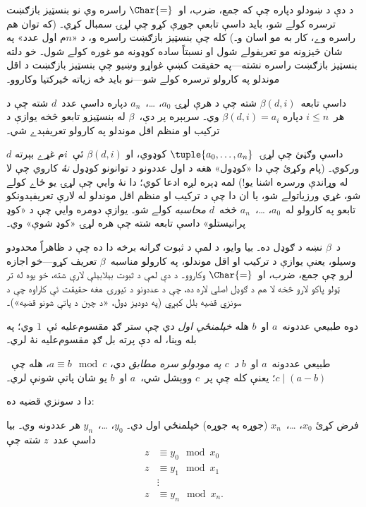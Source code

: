 \documentclass[../../../include/open-logic-section]{subfiles}
\begin{document}


د دې د ښودلو دپاره چې که جمع، ضرب، او~$\Char{=}$ راسره وي نو
بنسټيز بازګښت ترسره کولے شو، بايد داسې تابعې جوړې کړو چې لړۍ سمبال
کړي۔ (که توان هم راسره وے، کار به مو اسان و۔) کله چې بنسټيز بازګښت
راسره و، د «$n$م اول عدد» په شان څيزونه مو تعريفولے شول او نسبتاً
ساده کوډونه مو غوره کولے شول۔ خو دلته بنسټيز بازګښت راسره نشته---په
حقيقت کښې غواړو وښيو چې بنسټيز بازګښت د اقل موندلو په کارولو ترسره
کولے شو---نو بايد څه زياته ځيرکتيا وکاروو۔

\begin{lem}
داسې تابعه~$\beta(d,i)$ شته چې د هرې لړۍ $a_0$، \dots،~$a_n$
دپاره داسې عدد~$d$ شته چې د هر~$i \le n$ دپاره
$\beta(d,i) = a_i$ وي۔ سربېره پر دې،~$\beta$ له بنسټيزو تابعو څخه
يوازې د ترکيب او منظم اقل موندلو په کارولو تعريفېدے شي۔
\end{lem}

$d$ داسې وګڼئ چې لړۍ~$\tuple{a_0, \dots, a_n}$ کوډوي، او
$\beta(d,i)$ ئې~$i$م غړے بېرته ورکوي۔ (پام وکړئ چې دا «کوډول» هغه
د اول عددونو د توانونو کوډول \emph{نۀ} کاروي چې لا له وړاندې ورسره
اشنا يو!) لمه ډېره لږه ادعا کوي؛ دا نۀ وايي چې لړۍ يو ځاے کولے شو،
غړي ورزياتولے شو، يا ان دا چې د ترکيب او منظم اقل موندلو له لارې
تعريفېدونکو تابعو په کارولو له~$a_0$، \dots،~$a_n$ څخه~$d$
\emph{محاسبه} کولے شو۔ يوازې دومره وايي چې د «کوډ پرانيستلو» داسې
تابعه شته چې هره لړۍ «کوډ شوې» وي۔

د~$\beta$ نښه د ګوډل ده۔ بيا وايو، د لمې د ثبوت ګرانه برخه دا ده
چې د ظاهراً محدودو وسيلو، يعنې يوازې د ترکيب او اقل موندلو، په
کارولو مناسبه~$\beta$ تعريف کړو---خو اجازه لرو چې جمع، ضرب،
او~$\Char{=}$ وکاروو۔ د دې لمې د ثبوت بېلابېلې لارې شته، خو يوه له
تر ټولو پاکو لارو څخه لا هم د ګوډل اصلي لاره ده، چې د عددونو د تيورۍ
هغه حقيقت ئې کاراوه چې د سونزي قضيه بلل کېږي (په دوديز ډول، «د چين
د پاتې شونو قضيه»)۔

\begin{defn}
دوه طبيعي عددونه~$a$ او~$b$ هله \emph{خپلمنځي اول} دي چې ستر
ګډ مقسوم‌عليه ئې~$1$ وي؛ په بله وينا، له دې پرته بل ګډ مقسوم‌عليه
نۀ لري۔
\end{defn}

\begin{defn}
طبيعي عددونه~$a$ او~$b$ \emph{د~$c$ په مودولو سره مطابق} دي،
$a \equiv b \mod c$، هله چې~$c \mid (a-b)$؛ يعنې کله چې پر~$c$
ووېشل شي،~$a$ او~$b$ يو شان پاتې شونې لري۔
\end{defn}

دا د سونزي قضيه ده:
\begin{thm}
فرض کړئ $x_0$، \dots،~$x_n$ (جوړه په جوړه) خپلمنځي اول دي۔
$y_0$، \dots،~$y_n$ هر عددونه وي۔ بيا داسې عدد~$z$ شته چې
\begin{align*}
z & \equiv y_0 \mod x_0 \\
z & \equiv y_1 \mod x_1 \\
& \vdots  \\
z & \equiv y_n \mod x_n.
\end{align*}
\end{thm}
\end{document}
